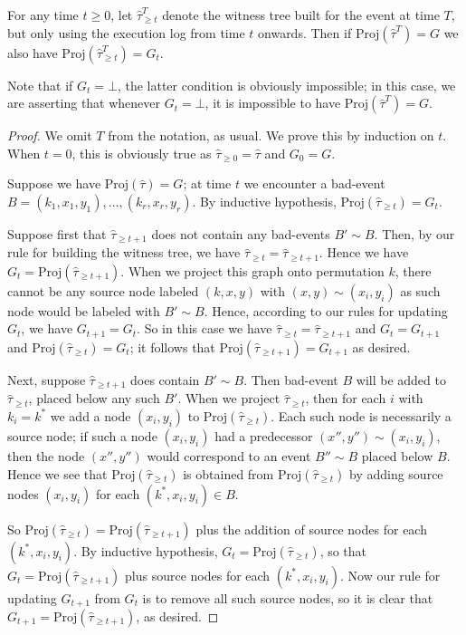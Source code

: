 \begin{proposition}
\label{future-prop1}
For any time $t \geq 0$, let $\hat \tau^T_{\geq t}$ denote the witness tree built for the event at time $T$, but only using the execution log from time $t$ onwards. Then if $\text{Proj}(\hat \tau^T) = G$ we also have $\text{Proj}(\hat \tau^T_{\geq t}) = G_t$. 

Note that if $G_t = \bot$, the latter condition is obviously impossible; in this case, we are asserting that whenever $G_t = \bot$, it is impossible to have $\text{Proj}(\hat \tau^T) = G$.
\end{proposition}
\begin{proof}
We omit $T$ from the notation, as usual. We prove this by induction on $t$. When $t = 0$, this is obviously true as $\hat \tau_{\geq 0} = \hat \tau$ and $G_0 = G$.

Suppose we have $\text{Proj}(\hat \tau) = G$; at time $t$ we encounter a bad-event $B = (k_1, x_1, y_1), \dots, (k_r, x_r, y_r)$. By inductive hypothesis, $\text{Proj}(\hat \tau_{\geq t}) = G_t$. 

Suppose first that $\hat \tau_{\geq t+1}$ does not contain any bad-events $B' \sim B$. Then, by our rule for building the witness tree, we have $\hat \tau_{\geq t} = \hat \tau_{\geq t+1}$. Hence we have $G_t = \text{Proj}(\hat \tau_{\geq t+1})$.  When we project this graph onto permutation $k$, there cannot be any source node labeled $(k, x, y)$ with $(x,y) \sim (x_i, y_i)$ as such node would be labeled with $B' \sim B$. Hence, according to our rules for updating $G_t$, we have $G_{t+1} = G_t$. So in this case we have $\hat \tau_{\geq t} = \hat \tau_{\geq t+1}$ and $G_t = G_{t+1}$ and $\text{Proj}(\hat \tau_{\geq t}) = G_t$; it follows that $\text{Proj}(\hat \tau_{\geq t+1}) = G_{t+1}$ as desired.

Next, suppose $\hat \tau_{\geq t+1}$ does contain $B' \sim B$. Then bad-event $B$ will be added to $\hat \tau_{\geq t}$, placed below any such $B'$. When we project $\hat \tau_{\geq t}$, then for each $i$ with $k_i = k^*$ we add a node $(x_i, y_i)$ to $\text{Proj}(\hat \tau_{\geq t})$. Each such node is necessarily a source node; if such a node $(x_i, y_i)$ had a predecessor $(x'', y'') \sim (x_i, y_i)$, then the node $(x'', y'')$ would correspond to an event $B'' \sim B$ placed below $B$. Hence we see that $\text{Proj}(\hat \tau_{\geq t})$ is obtained from $\text{Proj}(\hat \tau_{\geq t})$ by adding source nodes $(x_i,y_i)$ for each $(k^*, x_i, y_i) \in B$. 

So $\text{Proj}(\hat \tau_{\geq t}) = \text{Proj}(\hat \tau_{\geq t+1})$ plus the addition of source nodes for each $(k^*, x_i, y_i)$. By inductive hypothesis, $G_t = \text{Proj}(\hat \tau_{\geq t})$, so that $G_t = \text{Proj}(\hat \tau_{\geq t+1})$ plus source nodes for each $(k^*, x_i, y_i)$. Now our rule for updating $G_{t+1}$ from $G_t$ is to remove all such source nodes, so it is clear that $G_{t+1} = \text{Proj}(\hat \tau_{\geq t+1})$, as desired.


\end{proof}
